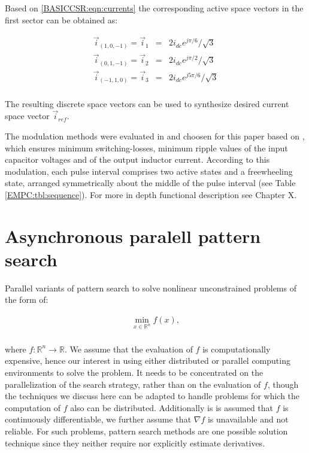 		Based on \ref{BASICCSR:eqn:currents} the corresponding active space vectors in the first sector can be obtained as:
		
		\begin{equation}
        \begin{array}{rcl}
            \vec{i}_{(1,0,-1)}=\vec{i}_1&=&2i_{dc}e^{j\pi/6}/\sqrt{3}\\
						\vec{i}_{(0,1,-1)}=\vec{i}_2&=&2i_{dc}e^{j\pi/2}/\sqrt{3}\\
						\vec{i}_{(-1,1,0)}=\vec{i}_3&=&2i_{dc}e^{j5\pi/6}/\sqrt{3}\\
        \end{array}
        \label{BASICCSR:eqn:currents}
    \end{equation}
		
		The resulting discrete space vectors can be used to synthesize desired current
space vector $\vec{i}_{ref}$. 

The modulation methods were evaluated in and choosen for this paper based on \cite{moussaoui2005open}, which ensures minimum switching-losses, minimum ripple values of the input capacitor voltages and of the output inductor current. According to this modulation, each pulse interval comprises two active states and a freewheeling state, arranged symmetrically about the middle of the pulse interval (see Table \ref{EMPC:tbl:sequence}). For more in depth functional description see Chapter X.


\section{Asynchronous paralell pattern search}\label{BASICUNB:sec:APPS}

Parallel variants of pattern search to solve nonlinear unconstrained problems of the form of:

\begin{equation}
        \begin{array}{rcl}
            \min_{x\in\mathbb{R}^n}f(x),\\
        \end{array}
        \label{BASICCSR:eqn:currents}
    \end{equation}
		
		where $f:\mathbb{R}^n\longrightarrow\mathbb{R}$. We assume that the evaluation of $f$ is computationally expensive, hence our interest in using either distributed or parallel computing environments to solve the problem. It needs to be concentrated on the parallelization of the search strategy, rather than on the evaluation of $f$, though the techniques we discuss here can be adapted to handle problems for which the computation of $f$ also can be distributed. Additionally is is assumed that $f$ is continuously differentiable, we further assume that $\nabla f$ is unavailable
and not reliable. For such problems, pattern search methods are one possible solution technique since they neither require nor explicitly estimate derivatives.\\

